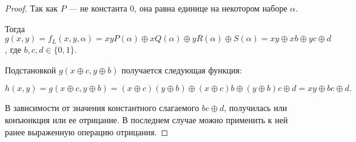 \begin{proof}
    Так как $P$ --- не константа 0, она равна единице на некотором наборе $\alpha$.

    Тогда $g(x, y) = f_L(x, y, \alpha) = xyP(\alpha) \oplus xQ(\alpha) \oplus yR(\alpha) \oplus S(\alpha) = xy \oplus xb \oplus yc \oplus d$, где $b, c, d \in \{0, 1\}$.

    Подстановкой $g(x \oplus c, y \oplus b)$ получается следующая функция:

    \[ h(x, y) = g(x \oplus c, y \oplus b) = (x \oplus c)(y \oplus b) \oplus (x \oplus c)b \oplus (y \oplus b)c \oplus d = xy \oplus bc \oplus d. \]

    В зависимости от значения константного слагаемого $bc \oplus d$, получилась или конъюнкция или ее отрицание. В последнем случае можно применить к ней ранее выраженную операцию отрицания.
\end{proof}